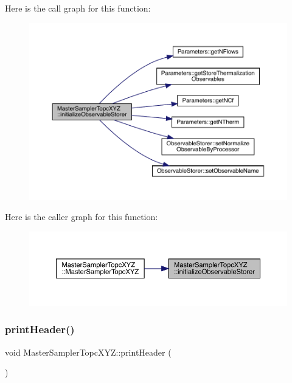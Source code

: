 Here is the call graph for this function\+:\nopagebreak
\begin{figure}[H]
\begin{center}
\leavevmode
\includegraphics[width=350pt]{class_master_sampler_topc_x_y_z_af6d2cf2023d9626908fd26b07a7a0b84_cgraph}
\end{center}
\end{figure}
Here is the caller graph for this function\+:\nopagebreak
\begin{figure}[H]
\begin{center}
\leavevmode
\includegraphics[width=350pt]{class_master_sampler_topc_x_y_z_af6d2cf2023d9626908fd26b07a7a0b84_icgraph}
\end{center}
\end{figure}
\mbox{\label{class_master_sampler_topc_x_y_z_a630a504ecbf3ceb517ebeefb39c3faff}} 
\subsubsection{\texorpdfstring{printHeader()}{printHeader()}}
{\footnotesize\ttfamily void Master\+Sampler\+Topc\+X\+Y\+Z\+::print\+Header (\begin{DoxyParamCaption}{ }\end{DoxyParamCaption})\hspace{0.3cm}{\ttfamily [virtual]}}



